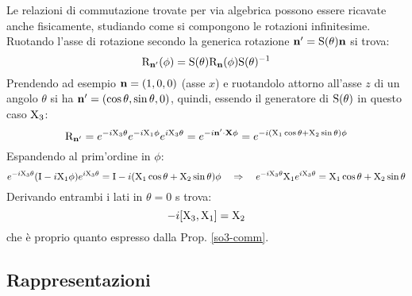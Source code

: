 Le relazioni di commutazione trovate per via algebrica possono essere ricavate anche fisicamente, studiando come si compongono le rotazioni infinitesime. Ruotando l'asse di rotazione secondo la generica rotazione $ \mathbf{n}' = \mathrm{S}(\theta) \mathbf{n} $ si trova:
\begin{equation}
	\mathrm{R}_{\mathbf{n}'}(\phi) = \mathrm{S}(\theta) \mathrm{R}_{\mathbf{n}}(\phi) \mathrm{S}(\theta)^{-1}
	\label{eq:9.16}
\end{equation}
Prendendo ad esempio $ \mathbf{n} = (1,0,0) $ (asse $ x $) e ruotandolo attorno all'asse $ z $ di un angolo $ \theta $ si ha $ \mathbf{n}' = (\cos \theta, \sin \theta, 0) $, quindi, essendo il generatore di $ \mathrm{S}(\theta) $ in questo caso $ \mathrm{X}_3 $:
\begin{equation*}
	\mathrm{R}_{\mathbf{n}'} = e^{-i \mathrm{X}_3 \theta} e^{-i \mathrm{X}_1 \phi} e^{i \mathrm{X}_3 \theta} = e^{-i \mathbf{n}' \cdot \mathbf{X} \phi} = e^{-i (\mathrm{X}_1 \cos \theta + \mathrm{X}_2 \sin \theta) \phi}
\end{equation*}
Espandendo al prim'ordine in $ \phi $:
\begin{equation*}
	e^{-i \mathrm{X}_3 \theta} (\mathrm{I} - i \mathrm{X}_1 \phi) e^{i \mathrm{X}_3 \theta} = \mathrm{I} - i (\mathrm{X}_1 \cos \theta + \mathrm{X}_2 \sin \theta) \phi
	\quad \Rightarrow \quad
	e^{-i \mathrm{X}_3 \theta} \mathrm{X}_1 e^{i \mathrm{X}_3 \theta} = \mathrm{X}_1 \cos \theta + \mathrm{X}_2 \sin \theta
\end{equation*}
Derivando entrambi i lati in $ \theta = 0 $ s trova:
\begin{equation*}
	-i [\mathrm{X}_3, \mathrm{X}_1] = \mathrm{X}_2
\end{equation*}
che è proprio quanto espresso dalla Prop. \ref{so3-comm}.

\subsection{Rappresentazioni}

